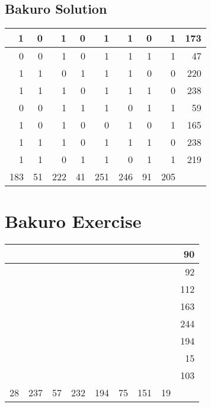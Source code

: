 \documentclass[]{article}
\begin{document}
 \subsection{Bakuro Solution} 
\begin{tabular}{rrrrrrrrr}
\hline
   1 &  0 &   1 &  0 &   1 &   1 &  0 &   1 & 173 \\ \hline
   0 &  0 &   1 &  0 &   1 &   1 &  1 &   1 &  47 \\ \hline
   1 &  1 &   0 &  1 &   1 &   1 &  0 &   0 & 220 \\ \hline
   1 &  1 &   1 &  0 &   1 &   1 &  1 &   0 & 238 \\ \hline
   0 &  0 &   1 &  1 &   1 &   0 &  1 &   1 &  59 \\ \hline
   1 &  0 &   1 &  0 &   0 &   1 &  0 &   1 & 165 \\ \hline
   1 &  1 &   1 &  0 &   1 &   1 &  1 &   0 & 238 \\ \hline
   1 &  1 &   0 &  1 &   1 &   0 &  1 &   1 & 219 \\ \hline
 183 & 51 & 222 & 41 & 251 & 246 & 91 & 205 &     \\ \hline
\hline
\end{tabular}\newpage\section{Bakuro Exercise}\begin{tabular}{rrrrrrrrr}
\hline
    &     &    &     &     &    &     &    &  90 \\ \hline
    &     &    &     &     &    &     &    &  92 \\ \hline
    &     &    &     &     &    &     &    & 112 \\ \hline
    &     &    &     &     &    &     &    & 163 \\ \hline
    &     &    &     &     &    &     &    & 244 \\ \hline
    &     &    &     &     &    &     &    & 194 \\ \hline
    &     &    &     &     &    &     &    &  15 \\ \hline
    &     &    &     &     &    &     &    & 103 \\ \hline
 28 & 237 & 57 & 232 & 194 & 75 & 151 & 19 &     \\ \hline
\hline
\end{tabular}\newpage 
\end{document}
